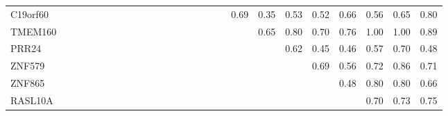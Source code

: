 \begin{longtable}{lrrrrrrrrrrrrrrrrrrrrrrrrr}
C19orf60      &               &            &                &               &            &               &             &               &               &              &             &             &                &               &                     &             &                &          0.69 &        0.35 &         0.53 &         0.52 &          0.66 &       0.56 &         0.65 &            0.80 \\
TMEM160       &               &            &                &               &            &               &             &               &               &              &             &             &                &               &                     &             &                &               &        0.65 &         0.80 &         0.70 &          0.76 &       1.00 &         1.00 &            0.89 \\
PRR24         &               &            &                &               &            &               &             &               &               &              &             &             &                &               &                     &             &                &               &             &         0.62 &         0.45 &          0.46 &       0.57 &         0.70 &            0.48 \\
ZNF579        &               &            &                &               &            &               &             &               &               &              &             &             &                &               &                     &             &                &               &             &              &         0.69 &          0.56 &       0.72 &         0.86 &            0.71 \\
ZNF865        &               &            &                &               &            &               &             &               &               &              &             &             &                &               &                     &             &                &               &             &              &              &          0.48 &       0.80 &         0.80 &            0.66 \\
RASL10A       &               &            &                &               &            &               &             &               &               &              &             &             &                &               &                     &             &                &               &             &              &              &               &       0.70 &         0.73 &            0.75 \\

\end{longtable}
